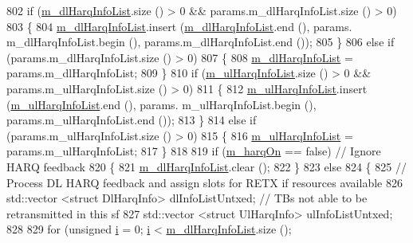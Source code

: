 \begin{DoxyCode}
802         \textcolor{keywordflow}{if} (\hyperlink{classns3_1_1MmWaveFlexTtiMaxRateMacScheduler_a06e986195cd0656360fe3b94ac65d6ad}{m\_dlHarqInfoList}.size () > 0 && params.m\_dlHarqInfoList.size () > 0)
803         \{
804                 \hyperlink{classns3_1_1MmWaveFlexTtiMaxRateMacScheduler_a06e986195cd0656360fe3b94ac65d6ad}{m\_dlHarqInfoList}.insert (\hyperlink{classns3_1_1MmWaveFlexTtiMaxRateMacScheduler_a06e986195cd0656360fe3b94ac65d6ad}{m\_dlHarqInfoList}.end (), params.
      m\_dlHarqInfoList.begin (), params.m\_dlHarqInfoList.end ());
805         \}
806         \textcolor{keywordflow}{else} \textcolor{keywordflow}{if} (params.m\_dlHarqInfoList.size () > 0)
807         \{
808                 \hyperlink{classns3_1_1MmWaveFlexTtiMaxRateMacScheduler_a06e986195cd0656360fe3b94ac65d6ad}{m\_dlHarqInfoList} = params.m\_dlHarqInfoList;
809         \}
810         \textcolor{keywordflow}{if} (\hyperlink{classns3_1_1MmWaveFlexTtiMaxRateMacScheduler_a686a92955acbcdcde854c36eb9aaf82d}{m\_ulHarqInfoList}.size () > 0 && params.m\_ulHarqInfoList.size () > 0)
811         \{
812                 \hyperlink{classns3_1_1MmWaveFlexTtiMaxRateMacScheduler_a686a92955acbcdcde854c36eb9aaf82d}{m\_ulHarqInfoList}.insert (\hyperlink{classns3_1_1MmWaveFlexTtiMaxRateMacScheduler_a686a92955acbcdcde854c36eb9aaf82d}{m\_ulHarqInfoList}.end (), params.
      m\_ulHarqInfoList.begin (), params.m\_ulHarqInfoList.end ());
813         \}
814         \textcolor{keywordflow}{else} \textcolor{keywordflow}{if} (params.m\_ulHarqInfoList.size () > 0)
815         \{
816                 \hyperlink{classns3_1_1MmWaveFlexTtiMaxRateMacScheduler_a686a92955acbcdcde854c36eb9aaf82d}{m\_ulHarqInfoList} = params.m\_ulHarqInfoList;
817         \}
818 
819         \textcolor{keywordflow}{if} (\hyperlink{classns3_1_1MmWaveFlexTtiMaxRateMacScheduler_a43dee0cca8dce652c2a2dc750262708e}{m\_harqOn} == \textcolor{keyword}{false})          \textcolor{comment}{// Ignore HARQ feedback}
820         \{
821                 \hyperlink{classns3_1_1MmWaveFlexTtiMaxRateMacScheduler_a06e986195cd0656360fe3b94ac65d6ad}{m\_dlHarqInfoList}.clear ();
822         \}
823         \textcolor{keywordflow}{else}
824         \{
825                 \textcolor{comment}{// Process DL HARQ feedback and assign slots for RETX if resources available}
826                 std::vector <struct DlHarqInfo> dlInfoListUntxed;  \textcolor{comment}{// TBs not able to be retransmitted in
       this sf}
827                 std::vector <struct UlHarqInfo> ulInfoListUntxed;
828 
829                 \textcolor{keywordflow}{for} (\textcolor{keywordtype}{unsigned} \hyperlink{bernuolliDistribution_8m_a6f6ccfcf58b31cb6412107d9d5281426}{i} = 0; \hyperlink{bernuolliDistribution_8m_a6f6ccfcf58b31cb6412107d9d5281426}{i} < \hyperlink{classns3_1_1MmWaveFlexTtiMaxRateMacScheduler_a06e986195cd0656360fe3b94ac65d6ad}{m\_dlHarqInfoList}.size (); 

\end{DoxyCode}
